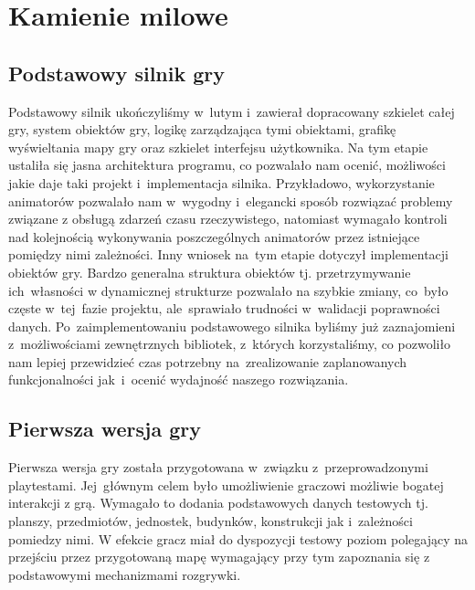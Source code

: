 \documentclass[licencjacka]{pracamgr}
\begin{document}
  \chapter{Kamienie milowe}
    \section{Podstawowy silnik gry}
    Podstawowy silnik ukończyliśmy w~lutym i~zawierał dopracowany szkielet całej gry, system obiektów gry,
    logikę zarządzająca tymi obiektami, grafikę wyświeltania mapy gry oraz szkielet interfejsu użytkownika.
    Na tym etapie ustaliła się jasna architektura programu, co pozwalało nam ocenić, możliwości jakie
    daje taki projekt i~implementacja silnika. Przykładowo, wykorzystanie animatorów pozwalało nam w~wygodny
    i~elegancki sposób rozwiązać problemy związane z obsługą zdarzeń czasu rzeczywistego, natomiast wymagało kontroli
    nad kolejnością wykonywania poszczególnych animatorów przez istniejące pomiędzy nimi zależności. Inny wniosek
    na~tym etapie dotyczył implementacji obiektów gry. Bardzo generalna struktura obiektów tj. przetrzymywanie
    ich~własności w dynamicznej strukturze pozwalało na szybkie zmiany, co~było częste w~tej~fazie projektu,
    ale~sprawiało trudności w~walidacji poprawności danych.
    Po~zaimplementowaniu podstawowego silnika byliśmy już zaznajomieni z~możliwościami zewnętrznych bibliotek,
    z~których korzystaliśmy, co pozwoliło nam lepiej przewidzieć czas potrzebny na~zrealizowanie zaplanowanych
    funkcjonalności jak~i~ocenić wydajność naszego rozwiązania.

    \section{Pierwsza wersja gry}
    Pierwsza wersja gry została przygotowana w~związku z~przeprowadzonymi playtestami. Jej~głównym celem było
    umożliwienie graczowi możliwie bogatej interakcji z grą. Wymagało to dodania podstawowych
    danych testowych tj. planszy, przedmiotów, jednostek, budynków, konstrukcji jak i~zależności pomiedzy nimi.
    W efekcie gracz miał do dyspozycji testowy poziom polegający na przejściu przez przygotowaną mapę wymagający
    przy tym zapoznania się z podstawowymi mechanizmami rozgrywki.
\end{document}
